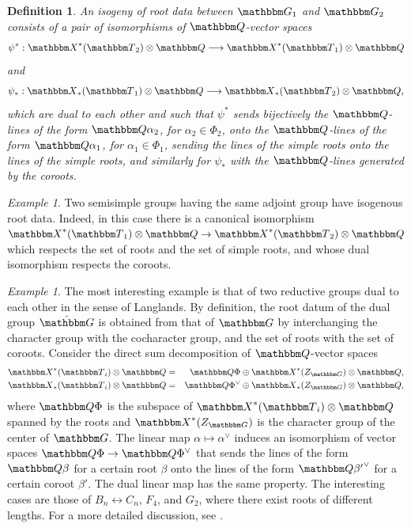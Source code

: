\documentclass[12pt,english]{smfart}
\numberwithin{equation}{subsection}
\newtheorem{definition}[equation]{Definition}
\theoremstyle{remark}
\newtheorem{exemple}[equation]{Example}
\newcommand\GG{{\mathbbm G}}
\newcommand\QQ{{\mathbbm Q}}
\newcommand\bbT{{\mathbbm T}}
\newcommand\bbG{{\mathbbm G}}
\newcommand\bbX{{\mathbbm X}}
\begin{document}
\begin{definition}\label{isogenie donnees radicielles}
An isogeny of root data between $\bbG_1$ and $\bbG_2$ consists of a pair of isomorphisms of $\QQ$-vector spaces
$$\psi^*:\bbX^*(\bbT_2)\otimes\QQ \longrightarrow \bbX^*(\bbT_1)\otimes\QQ$$
and
$$
\psi_*:\bbX_*(\bbT_1)\otimes\QQ \longrightarrow
\bbX_*(\bbT_2)\otimes\QQ,
$$
which are dual to each other and such that $\psi^*$ sends bijectively the $\QQ$-lines of the form $\QQ \alpha_2$, for $\alpha_2\in \Phi_2$, onto the $\QQ$-lines of the form $\QQ \alpha_1$, for $\alpha_1\in \Phi_1$, sending the lines of the simple roots onto the lines of the simple roots, and similarly for $\psi_*$ with the $\QQ$-lines generated by the coroots.
\end{definition}

\begin{exemple}
Two semisimple groups having the same adjoint group have isogenous root data. Indeed, in this case there is a canonical isomorphism $\bbX^*(\bbT_1)\otimes \QQ\rightarrow \bbX^*(\bbT_2)\otimes\QQ$ which respects the set of roots and the set of simple roots, and whose dual isomorphism respects the coroots.
\end{exemple}

\begin{exemple}
The most interesting example is that of two reductive groups dual to each other in the sense of Langlands. By definition, the root datum of the dual group $\hat\bbG$ is obtained from that of $\bbG$ by interchanging the character group with the cocharacter group, and the set of roots with the set of coroots. Consider the direct sum decomposition of $\QQ$-vector spaces
\begin{eqnarray*}
\bbX^*(\bbT_i)\otimes\QQ&=&\QQ\Phi \oplus \bbX^*(Z_\GG)\otimes\QQ,\\
\bbX_*(\bbT_i)\otimes\QQ&=&\QQ\Phi^\vee \oplus \bbX_*(Z_\GG)\otimes\QQ,
\end{eqnarray*}
where $\QQ\Phi$ is the subspace of $\bbX^*(\bbT_i)\otimes\QQ$ spanned by the roots and $\bbX^*(Z_\GG)$ is the character group of the center of $\GG$. The linear map $\alpha\mapsto \alpha^\vee$ induces an isomorphism of vector spaces $\QQ\Phi\rightarrow \QQ\Phi^\vee$ that sends the lines of the form $\QQ \beta$ for a certain root $\beta$ onto the lines of the form $\QQ {\beta'}^\vee$ for a certain coroot $\beta'$. The dual linear map has the same property. The interesting cases are those of $B_n\leftrightarrow C_n$, $F_4$, and $G_2$, where there exist roots of different lengths. For a more detailed discussion, see \cite[page 14]{W-tordu}.
\end{exemple}
\end{document}
